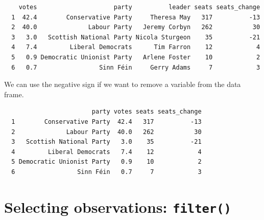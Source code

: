 \documentclass[12pt,oneside]{reedthesis}
\theoremstyle{definition}
\theoremstyle{definition}
\theoremstyle{definition}
\theoremstyle{remark}
\begin{document}
  \begin{verbatim}
    votes                     party          leader seats seats_change
  1  42.4        Conservative Party     Theresa May   317          -13
  2  40.0              Labour Party   Jeremy Corbyn   262           30
  3   3.0   Scottish National Party Nicola Sturgeon    35          -21
  4   7.4         Liberal Democrats      Tim Farron    12            4
  5   0.9 Democratic Unionist Party   Arlene Foster    10            2
  6   0.7                 Sinn Féin     Gerry Adams     7            3
  \end{verbatim}
  We can use the negative sign if we want to remove a variable from the
  data frame.
  \begin{Shaded}
  \begin{Highlighting}[]
  \OperatorTok{-}
  \end{Highlighting}
  \end{Shaded}
  \begin{verbatim}
                        party votes seats seats_change
  1        Conservative Party  42.4   317          -13
  2              Labour Party  40.0   262           30
  3   Scottish National Party   3.0    35          -21
  4         Liberal Democrats   7.4    12            4
  5 Democratic Unionist Party   0.9    10            2
  6                 Sinn Féin   0.7     7            3
  \end{verbatim}
  \section{\texorpdfstring{Selecting observations:
  \texttt{filter()}}{Selecting observations: filter()}}\label{selecting-observations-filter}
  
\end{document}
